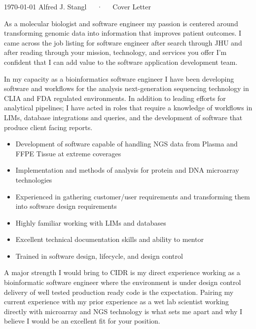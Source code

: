 \documentclass[11pt, letterpaper]{awesome-cv}
\begin{document}
\makecvheader[L]

\makecvfooter
  {\today}
  {Alfred J. Stangl~~~·~~~Cover Letter}
  {}

\makelettertitle

\begin{cvletter}

As a molecular biologist and software engineer my passion is centered around transforming genomic data into information that improves patient outcomes. I came across the job listing for software engineer after search through JHU and after reading through your mission, technology, and services you offer I’m confident that I can add value to the software application development team.

In my capacity as a bioinformatics software engineer I have been developing software and workflows for the analysis next-generation sequencing technology in CLIA and FDA regulated environments. In addition to leading efforts for analytical pipelines; I have acted in roles that require a knowledge of workflows in LIMs, database integrations and queries, and the development of software that produce client facing reports.
\begin{itemize}
  \item Development of software capable of handling NGS data from Plasma and FFPE Tissue at extreme coverages
  \item Implementation and methods of analysis for protein and DNA microarray technologies
  \item Experienced in gathering customer/user requirements and transforming them into software design requirements
  \item Highly familiar working with LIMs and databases
  \item Excellent technical documentation skills and ability to mentor
  \item Trained in software design, lifecycle, and design control
\end{itemize}
A major strength I would bring to CIDR is my direct experience working as a bioinformatic software engineer where the environment is under design control delivery of well tested production ready code is the expectation. Pairing my current experience with my prior experience as a wet lab scientist working directly with microarray and NGS technology is what sets me apart and why I believe I would be an excellent fit for your position.


\end{cvletter}
\end{document}
